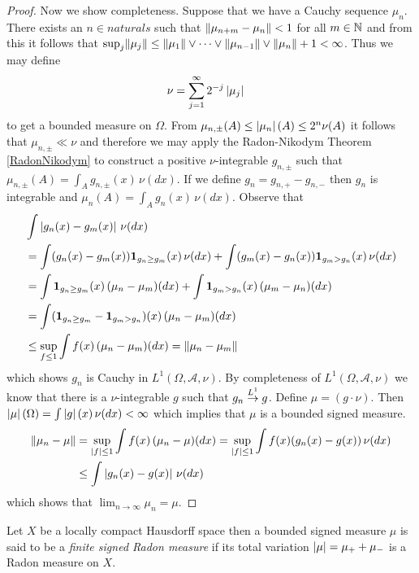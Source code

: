 \begin{proof}
Now we show completeness.  Suppose that we have a Cauchy sequence $\mu_n$.  There exists an $n \in naturals$ such that $\lVert \mu_{n+m} - \mu_n \rVert < 1$ for all $m \in \mathbb{N}$ and from this it follows that $\sup_j \lVert \mu_j \rVert \leq \lVert \mu_1 \rVert \vee \dotsb \vee \lVert \mu_{n-1} \rVert \vee \lVert \mu_n \rVert+1  <\infty$.  Thus we may define
\begin{align*}
\nu &= \sum_{j=1}^\infty 2^{-j} \left \vert \mu_j \right \vert
\end{align*}
to get a bounded measure on $\Omega$.  From $\mu_{n, \pm}(A) \leq \left \vert \mu_n \right \vert(A) \leq 2^n \nu(A)$ it follows that $\mu_{n, \pm} \ll \nu$ and therefore we may apply the Radon-Nikodym Theorem \ref{RadonNikodym} to construct
a positive $\nu$-integrable $g_{n,\pm}$ such that $\mu_{n, \pm}(A) = \int_A g_{n,\pm}(x) \, \nu(dx)$.  If we define $g_n = g_{n,+} - g_{n,-}$ then $g_n$ is integrable and $\mu_{n}(A) = \int_A g_{n}(x) \, \nu(dx)$.   Observe that 
\begin{align*}
&\int \left \vert g_n(x) - g_m(x) \right \vert \, \nu(dx) \\
&= \int (g_n(x) - g_m(x)) \textbf{1}_{g_n\geq g_m}(x) \, \nu(dx) + \int (g_m(x) - g_n(x)) \textbf{1}_{g_m > g_n}(x) \, \nu(dx) \\
&= \int \textbf{1}_{g_n\geq g_m}(x) \, (\mu_n - \mu_m) (dx) + \int \textbf{1}_{g_m > g_n}(x) \, (\mu_m - \mu_n) (dx) \\
&= \int (\textbf{1}_{g_n\geq g_m} - \textbf{1}_{g_m > g_n}) (x) \, (\mu_n - \mu_m) (dx) \\
&\leq \sup_{f \leq 1} \int f(x) \, (\mu_n-\mu_m)(dx) = \lVert \mu_n - \mu_m \rVert \\
\end{align*}
which shows $g_n$ is Cauchy in $L^1(\Omega, \mathcal{A}, \nu)$.  By completeness of $L^1(\Omega, \mathcal{A}, \nu)$ we know that there is a $\nu$-integrable $g$ such that $g_n \overset{L^1}\to g$.  Define 
$\mu = (g \cdot \nu)$.  Then $\left \vert \mu \right \vert(\Omega) = \int \left \vert g \right \vert(x) \, \nu(dx) < \infty$ which implies that $\mu$ is a bounded signed measure.
\begin{align*}
\lVert \mu_n - \mu \rVert &= \sup_{\left \vert f \right \vert \leq 1} \int f(x) \, (\mu_n - \mu)(dx) = \sup_{\left \vert f \right \vert \leq 1} \int f(x) (g_n(x) - g(x)) \, \nu(dx) \\
&\leq \int \left \vert g_n(x) - g(x) \right \vert \, \nu(dx)
\end{align*}
which shows that $\lim_{n \to \infty} \mu_n = \mu$.
\end{proof}

\begin{defn}Let $X$ be a locally compact Hausdorff space then a
  bounded signed
  measure $\mu$ is said to be a \emph{finite signed Radon measure} if its
  total variation $\left \vert \mu \right \vert = \mu_+ + \mu_-$ is a Radon measure on $X$.
\end{defn}

